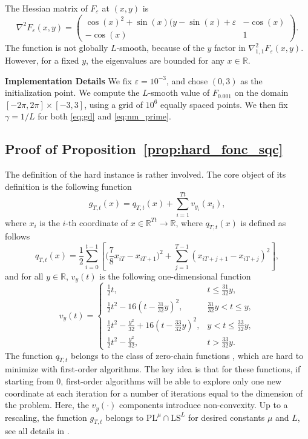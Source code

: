 \documentclass{article}
\def\R{{\mathbb{R}}}
\def\pl{{\text{PL}^\mu}}
\newcommand{\ls}{\text{LS}^{L}}
\theoremstyle{plain}
\theoremstyle{definition}
\theoremstyle{remark}
\begin{document}
The Hessian matrix of $F_{\varepsilon}$ at $(x,y)$ is
\[ \nabla^2  F_{\varepsilon}(x,y) = \begin{pmatrix}
   \cos(x)^2 + \sin(x)(y-\sin(x) +\varepsilon & -\cos(x) \\ -\cos(x) & 1
\end{pmatrix}.\]
The function is not globally $L$-smooth, because of the $y$ factor in $\nabla^2_{1,1} F_{\varepsilon}(x,y)$. However, for a fixed $y$, the eigenvalues are bounded for any $x\in \R$.

\textbf{Implementation Details \:} We fix $\varepsilon = 10^{-3}$, and chose $(0,3)$ as the initialization point. We compute the $L$-smooth value of $F_{0.001}$ on the domain $[-2\pi,2\pi] \times [-3,3]$, using a grid of $10^6$ equally spaced points. We then fix $\gamma = 1/L$ for both \eqref{eq:gd} and \eqref{eq:nm_prime}.

\subsection{Proof of Proposition~\ref{prop:hard_fonc_sqc}}\label{app:hard_fonc_sqc}
 The definition of the hard instance is rather involved. The core object of its definition is the following function
\[ g_{T,t}(x) = q_{T,t}(x) + \sum_{i=1}^{Tt}v_{y_i}(x_i), \]
where $x_i$ is the $i$-th coordinate of $x \in \R^{Tt} \to \R$, where $q_{T,t}(x)$ is defined as follows
\[q_{T,t}(x) = \frac{1}{2}\sum_{i=0}^{t-1}\left[ \Big(\frac{7}{8}x_{iT}-x_{iT+1}\Big)^2 + \sum_{j=1}^{T-1}(x_{iT+j+1}-x_{iT+j})^2 \right],\]
and for all $y\in \R$, $v_y(t)$ is the following one-dimensional function
\begin{equation*}
     v_y(t) = \left\{ \begin{array}{ll}
     \frac{1}{2}t,& t\le \frac{31}{32}y,  \\
     \frac{1}{2}t^2 - 16(t-\frac{31}{32}y)^2,& \frac{31}{32}y < t \le y,\\
     \frac{1}{2}t^2 - \frac{y^2}{32} + 16(t-\frac{33}{32}y)^2, &y<t\le \frac{33}{32}y,\\
     \frac{1}{2}t^2 - \frac{y^2}{32},&t>\frac{33}{32}y.\end{array} \right.  
\end{equation*}
The function $q_{T,t}$ belongs to the class of zero-chain functions \cite{nesterov2004introductory,lowerboundI,carmon2021lower}, which are hard to minimize with first-order algorithms. The key idea is that for these functions, if starting from $0$, first-order algorithms will be able to explore only one new coordinate at each iteration for a number of iterations equal to the dimension of the problem. Here, the $v_y(\cdot )$ components introduce non-convexity. Up to a rescaling, the function $g_{T,t}$ belongs to $\pl \cap \ls$ for desired constants $\mu$ and $L$, see all details in \cite{PLlowerbound}.
\end{document}
